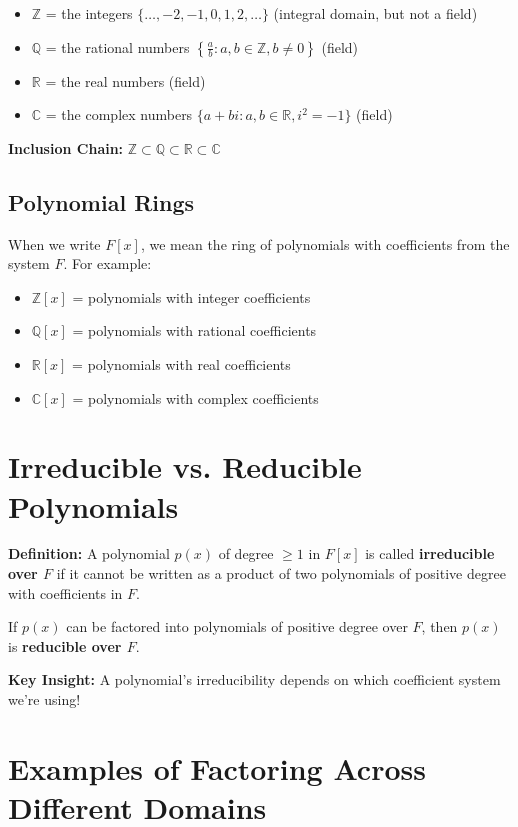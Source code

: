 \documentclass[12pt]{article}
\begin{document}
\begin{itemize}
\item $\mathbb{Z}$ = the integers $\{\ldots, -2, -1, 0, 1, 2, \ldots\}$ (integral domain, but not a field)
\item $\mathbb{Q}$ = the rational numbers $\left\{\frac{a}{b} : a, b \in \mathbb{Z}, b \neq 0\right\}$ (field)
\item $\mathbb{R}$ = the real numbers (field)
\item $\mathbb{C}$ = the complex numbers $\{a + bi : a, b \in \mathbb{R}, i^2 = -1\}$ (field)
\end{itemize}

\textbf{Inclusion Chain:} $\mathbb{Z} \subset \mathbb{Q} \subset \mathbb{R} \subset \mathbb{C}$

\subsection{Polynomial Rings}

When we write $F[x]$, we mean the ring of polynomials with coefficients from the system $F$. For example:
\begin{itemize}
\item $\mathbb{Z}[x]$ = polynomials with integer coefficients
\item $\mathbb{Q}[x]$ = polynomials with rational coefficients  
\item $\mathbb{R}[x]$ = polynomials with real coefficients
\item $\mathbb{C}[x]$ = polynomials with complex coefficients
\end{itemize}

\section{Irreducible vs. Reducible Polynomials}

\textbf{Definition:} A polynomial $p(x)$ of degree $\geq 1$ in $F[x]$ is called \textbf{irreducible over $F$} if it cannot be written as a product of two polynomials of positive degree with coefficients in $F$.

If $p(x)$ can be factored into polynomials of positive degree over $F$, then $p(x)$ is \textbf{reducible over $F$}.

\vspace{0.5cm}

\textbf{Key Insight:} A polynomial's irreducibility depends on which coefficient system we're using!

\section{Examples of Factoring Across Different Domains}
\end{document}

